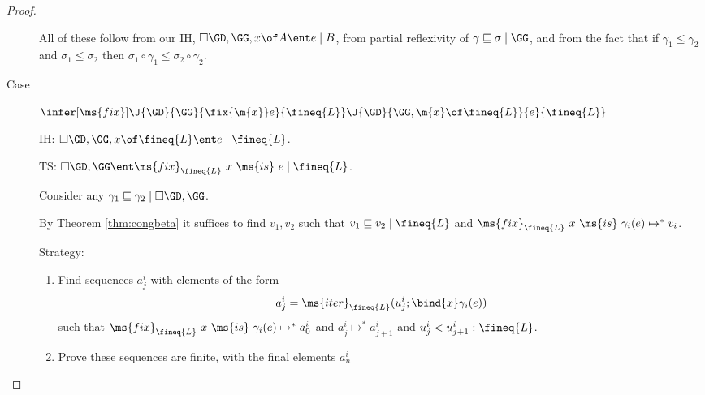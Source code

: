 \documentclass{article}
\newcommand{\ale}{\sqsubseteq}
\newcommand{\tfix}[2]{\ms{fix}_{#1}~{#2}~\ms{is}~}
\newcommand{\iter}[4]{\ms{iter}_{#1}({#2}; \bind{#3}#4)}
\newcommand{\step}{\mapsto}
\newcommand{\steps}{\step^*}
\newcommand{\lr}[2]{#2\mathrel{|}#1}
\newcommand{\lrcx}[3]{#1 \ent \lr{#2}{#3}}
\begin{document}
\begin{proof}
\begin{description}
    All of these follow from our IH, $\lrcx{\cxdisc{\GD},\GG,x\of A}{B}{e}$,
    from partial reflexivity of $\lr{\GG}{\gamma \ale \sigma}$, and from the fact
    that if $\gamma_1 \le \gamma_2$ and $\sigma_1 \le \sigma_2$ then $\sigma_1
    \circ \gamma_1 \le \sigma_2\circ\gamma_2$.



    \vspace{1em}
  \item[Case] $\infer[\ms{fix}]{\J{\GD}{\GG}{\fix{\m{x}} e}{\fineq{L}}}{
    \J{\GD}{\GG,\m{x}\of \fineq{L}}{e}{\fineq{L}}}$

    IH: $\lrcx{\cxdisc{\GD}, \GG, x \of \fineq{L}}{\fineq{L}}{e}$.

    TS: $\lrcx{\cxdisc{\GD}, \GG}{\fineq{L}}{\tfix{\fineq{L}}{x} e}$.


    Consider any $\lr{\cxdisc{\GD},\GG}{\gamma_1 \ale \gamma_2}$.

    By Theorem \ref{thm:congbeta} it suffices to find $v_1,v_2$ such that
    $\lr{\fineq{L}}{v_1 \ale v_2}$ and $\tfix{\fineq{L}}{x} \gamma_i(e) \steps
    v_i$.

    Strategy:
    \begin{enumerate}
    \item Find sequences $a^i_j$ with elements of the form \[ a^i_j =
      \iter{\fineq{L}}{u^i_j}{x}{\gamma_i(e)}
      \]
      such that $\tfix{\fineq{L}}{x} \gamma_i(e) \steps a^i_0$ and $a^i_j \steps
      a^i_{j+1}$ and $u^i_j < u^i_{j+1} : \fineq{L}$.

    \item Prove these sequences are finite, with the final elements $a^i_n$
    \end{enumerate}

    \TODO
  \end{description}
\end{proof}
\end{document}
